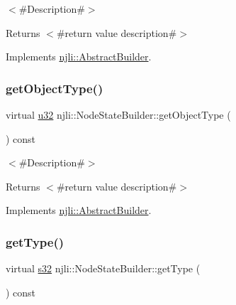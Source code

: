 $<$\#\+Description\#$>$

\begin{DoxyReturn}{Returns}
$<$\#return value description\#$>$ 
\end{DoxyReturn}


Implements \mbox{\hyperlink{classnjli_1_1_abstract_builder_a902f73ea78031b06aca183a417f3413b}{njli\+::\+Abstract\+Builder}}.

\mbox{\label{classnjli_1_1_node_state_builder_a13715317d483013399224e1053df0442}} 
\subsubsection{\texorpdfstring{get\+Object\+Type()}{getObjectType()}}
{\footnotesize\ttfamily virtual \mbox{\hyperlink{_util_8h_a10e94b422ef0c20dcdec20d31a1f5049}{u32}} njli\+::\+Node\+State\+Builder\+::get\+Object\+Type (\begin{DoxyParamCaption}{ }\end{DoxyParamCaption}) const\hspace{0.3cm}{\ttfamily [virtual]}}

$<$\#\+Description\#$>$

\begin{DoxyReturn}{Returns}
$<$\#return value description\#$>$ 
\end{DoxyReturn}


Implements \mbox{\hyperlink{classnjli_1_1_abstract_builder_a0f2d344fcf697b167f4f2b1122b5fb33}{njli\+::\+Abstract\+Builder}}.

\mbox{\label{classnjli_1_1_node_state_builder_a225d2ae7bd1e60f041d15ae5bd4492e1}} 
\subsubsection{\texorpdfstring{get\+Type()}{getType()}}
{\footnotesize\ttfamily virtual \mbox{\hyperlink{_util_8h_aa62c75d314a0d1f37f79c4b73b2292e2}{s32}} njli\+::\+Node\+State\+Builder\+::get\+Type (\begin{DoxyParamCaption}{ }\end{DoxyParamCaption}) const\hspace{0.3cm}{\ttfamily [virtual]}}

